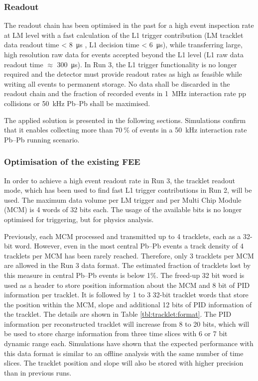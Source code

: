 \subsubsection{Readout}

The readout chain has been optimised in the past for a high event inspection rate at LM level with a fast calculation of the L1 trigger contribution (LM tracklet data readout time < \SI{8}{\micro \second} , L1 decision time < \SI{6}{\micro \second}), while transferring large, high resolution raw data for events accepted beyond the L1 level (L1 raw data readout time $\approx$ \SI{300}{\micro \second}). In Run 3, the L1 trigger functionality is no longer required and the detector must provide readout rates as high as feasible while writing all events to permanent storage. No data shall be discarded in the readout chain and the fraction of recorded events in \SI{1}{\mega \hertz} interaction rate pp collisions or \SI{50}{\kilo \hertz} Pb--Pb shall be maximised.

The applied solution is presented in the following sections. Simulations confirm that it enables collecting more than  $\SI{70}{\percent}$ of events in a \SI{50}{\kilo \hertz} interaction rate Pb--Pb running scenario.

\subsubsection{Optimisation of the existing FEE}

In order to achieve a high event readout rate in Run 3, the tracklet readout mode, which has been used to find fast L1 trigger contributions in Run 2, will be used.
The maximum data volume per LM trigger and per Multi Chip Module (MCM) is 4 words of 32 bits each. The usage of the available bits is no longer optimised for triggering, but for physics analysis.

Previously, each MCM processed and transmitted up to 4 tracklets, each as a 32-bit word.
However, even in the most central Pb--Pb events a track density of 4 tracklets per MCM has been rarely reached. Therefore, only 3 tracklets per MCM are allowed in the Run 3 data format. The estimated fraction of tracklets lost by this measure in central Pb--Pb events is below 1\%.
The freed-up 32 bit word is used as a header to store position information about the MCM and 8 bit of PID information per tracklet. It is followed by 1 to 3 32-bit tracklet words that store the position within the MCM, slope and additional 12 bits of PID information of the tracklet. The details are shown in Table \ref{tbl:tracklet:format}.
The PID information per reconstructed tracklet will increase from 8 to 20 bits, which will be used to store charge information from three time slices with 6 or 7 bit dynamic range each. Simulations have shown that the expected performance with this data format is similar to an offline analysis with the same number of time slices. The tracklet position and slope will also be stored with higher precision than in previous runs. 
 
